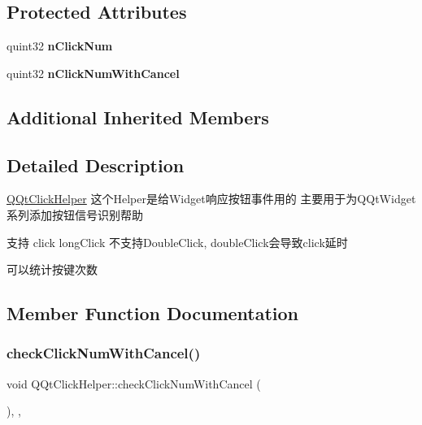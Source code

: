 \subsection*{Protected Attributes}
\begin{DoxyCompactItemize}
\item 
\mbox{\label{class_q_qt_click_helper_a965469fc42763d5f666bafbea08e8b0a}} 
quint32 {\bfseries n\+Click\+Num}
\item 
\mbox{\label{class_q_qt_click_helper_a42e07b924457ee8feabaf92b55c3c0a9}} 
quint32 {\bfseries n\+Click\+Num\+With\+Cancel}
\end{DoxyCompactItemize}
\subsection*{Additional Inherited Members}


\subsection{Detailed Description}
\mbox{\hyperlink{class_q_qt_click_helper}{Q\+Qt\+Click\+Helper}} 这个\+Helper是给\+Widget响应按钮事件用的 主要用于为\+Q\+Qt\+Widget系列添加按钮信号识别帮助

支持 click long\+Click 不支持\+Double\+Click, double\+Click会导致click延时

可以统计按键次数 

\subsection{Member Function Documentation}
\mbox{\label{class_q_qt_click_helper_ac66c7a5eccddec8d34fc74afd6a266f7}} 
\subsubsection{\texorpdfstring{check\+Click\+Num\+With\+Cancel()}{checkClickNumWithCancel()}}
{\footnotesize\ttfamily void Q\+Qt\+Click\+Helper\+::check\+Click\+Num\+With\+Cancel (\begin{DoxyParamCaption}{ }\end{DoxyParamCaption})\hspace{0.3cm}{\ttfamily [override]}, {\ttfamily [protected]}, {\ttfamily [virtual]}}

